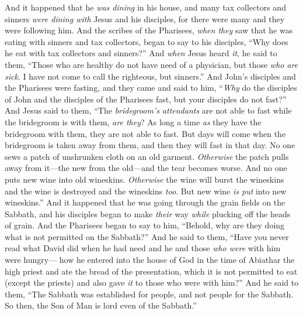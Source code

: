 \begin{biblechapter}
\verse And it happened that he \textit{was dining} in his house, and many tax collectors and sinners \textit{were dining with} Jesus and his disciples, for there were many and they were following him.
\verse And the scribes of the Pharisees, \textit{when they} saw that he was eating with sinners and tax collectors, began to say to his disciples, “Why does he eat with tax collectors and sinners?”
\verse And \textit{when} Jesus heard \textit{it}, he said to them, “Those who are healthy do not have need of a physician, but those \textit{who are sick}. I have not come to call the righteous, but sinners.”
 And John’s disciples and the Pharisees were fasting, and they came and said to him, “\textit{Why} do the disciples of John and the disciples of the Pharisees fast, but your disciples do not fast?”
\verse And Jesus said to them, “The \textit{bridegroom’s attendants} are not able to fast while the bridegroom is with them, \textit{are they}? As long a time \textit{as} they have the bridegroom with them, they are not able to fast.
\verse But days will come when the bridegroom is taken away from them, and then they will fast in that day.
\verse No one sews a patch of unshrunken cloth on an old garment. \textit{Otherwise} the patch pulls away from it—the new from the old—and the tear becomes worse.
\verse And no one puts new wine into old wineskins. \textit{Otherwise} the wine will burst the wineskins and the wine is destroyed and the wineskins \textit{too}. But new wine \textit{is put} into new wineskins.”
 And it happened that he was going through the grain fields on the Sabbath, and his disciples began to make \textit{their} way \textit{while} plucking off the heads of grain.
\verse And the Pharisees began to say to him, “Behold, why are they doing what is not permitted on the Sabbath?”
\verse And he said to them, “Have you never read what David did when he had need and he and those \textit{who were} with him were hungry—
\verse how he entered into the house of God in the time of Abiathar the high priest and ate the bread of the presentation, which it is not permitted to eat (except the priests) and also gave \textit{it} to those who were with him?”
\verse And he said to them, “The Sabbath was established for people, and not people for the Sabbath.
\verse So then, the Son of Man is lord even of the Sabbath.”
\end{biblechapter}

